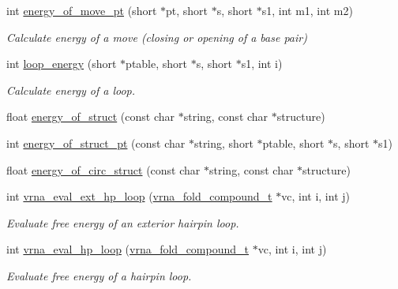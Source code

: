 \begin{DoxyCompactItemize}
int \hyperlink{group__eval_ga49e0ee561be69faf0568213546f6a53f}{energy\+\_\+of\+\_\+move\+\_\+pt} (short $\ast$pt, short $\ast$s, short $\ast$s1, int m1, int m2)
\begin{DoxyCompactList}\small\item\em Calculate energy of a move (closing or opening of a base pair) \end{DoxyCompactList}\item 
int \hyperlink{group__eval_ga507d4fd93f4b398d793ba2402731388d}{loop\+\_\+energy} (short $\ast$ptable, short $\ast$s, short $\ast$s1, int i)
\begin{DoxyCompactList}\small\item\em Calculate energy of a loop. \end{DoxyCompactList}\item 
float \hyperlink{group__eval_gac2b37fea2145c94d925a3f33378ef87b}{energy\+\_\+of\+\_\+struct} (const char $\ast$string, const char $\ast$structure)
\item 
int \hyperlink{group__eval_ga27ce6f68512d43bf1fe14a06c9d76d5c}{energy\+\_\+of\+\_\+struct\+\_\+pt} (const char $\ast$string, short $\ast$ptable, short $\ast$s, short $\ast$s1)
\item 
float \hyperlink{group__eval_ga657222e2758c46bf13b416ef3032e417}{energy\+\_\+of\+\_\+circ\+\_\+struct} (const char $\ast$string, const char $\ast$structure)
\item 
\hypertarget{group__eval_gad3b92453a6b501856eec8fae39f3235d}{}int \hyperlink{group__eval_gad3b92453a6b501856eec8fae39f3235d}{vrna\+\_\+eval\+\_\+ext\+\_\+hp\+\_\+loop} (\hyperlink{group__fold__compound_ga1b0cef17fd40466cef5968eaeeff6166}{vrna\+\_\+fold\+\_\+compound\+\_\+t} $\ast$vc, int i, int j)\label{group__eval_gad3b92453a6b501856eec8fae39f3235d}

\begin{DoxyCompactList}\small\item\em Evaluate free energy of an exterior hairpin loop. \end{DoxyCompactList}\item 
int \hyperlink{group__eval_gab3eb4651dc26dc2b653a57dd340d7e68}{vrna\+\_\+eval\+\_\+hp\+\_\+loop} (\hyperlink{group__fold__compound_ga1b0cef17fd40466cef5968eaeeff6166}{vrna\+\_\+fold\+\_\+compound\+\_\+t} $\ast$vc, int i, int j)
\begin{DoxyCompactList}\small\item\em Evaluate free energy of a hairpin loop. \end{DoxyCompactList}\end{DoxyCompactItemize}
